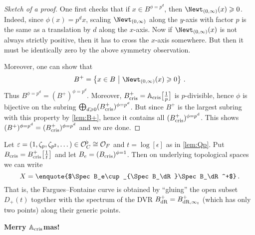 \documentclass[a4paper, 10pt, oneside, DIV=9, chapterprefix=true, numbers=enddot,bibliography=totoc]{scrbook}
\begin{document}
\begin{proof}[Sketch of a proof]
	One first checks that if $x\in B^{\phi=p^d}$, then $\Newt_{(0,\infty)}(x)\geq 0$. Indeed, since $\phi(x)=p^dx$, scaling $\Newt_{(0,\infty)}$ along the $y$-axis with factor $p$ is the same as a translation by $d$ along the $x$-axis. Now if $\Newt_{(0,\infty)}(x)$ is not always strictly positive, then it has to cross the $x$-axis somewhere. But then it must be identically zero by the above symmetry observation.
	
	Moreover, one can show that
	\begin{equation*}
		B^+=\left\{x\in B\st\Newt_{(0,\infty)}(x)\geq 0\right\}\,.
	\end{equation*}
	Thus $B^{\phi=p^d}=(B^+)^{\phi=p^d}$. Moreover, $B_{\mathrm{cris}}^+=\mathbb{A}_{\mathrm{cris}}\big[\textstyle\frac{1}{p}\big]$ is $p$-divisible, hence $\phi$ is bijective on the subring $\bigoplus_{d\geq 0}(B_\cris^+)^{\smash{\phi=p^d}}$. But since $B^+$ is the largest subring with this property by \cref{lem:B+}, hence it contains all $(B_\cris^+)^{\phi=p^d}$. This shows $(B^+)^{\phi=p^d}=(B_\cris^+)^{\phi=p^d}$ and we are done.
\end{proof}
\begin{rem}
	Let $\varepsilon=(1,\zeta_p,\zeta_{p^2},\dotsc)\in \mathcal{O}_C^\flat\cong \mathcal{O}_F$ and $t=\log{[\epsilon]}$ as in \cref{lem:Qp}. Put $B_{\mathrm{cris}}=B_{\mathrm{cris}}^+\big[\textstyle\frac{1}{t}\big]$ and let $B_e=(B_\cris)^{\phi=1}$. Then on underlying topological spaces we can write
	\begin{equation*}
		X=\text{\enquote{$\Spec B_e\cup_{\Spec B_\dR}\Spec B_\dR^+$}}\,.
	\end{equation*}
	That is, the Fargues--Fontaine curve is obtained by \enquote{gluing} the open subset $D_+(t)$ together with the spectrum of the DVR $B_{\mathrm{dR}}^+=B_{\mathrm{dR},\infty_t}^+$ (which has only two points) along their generic points.
\end{rem}
\begin{center}
	\Large\bfseries Merry $\mathbb{A}_{\mathrm{cris}}$mas!
\end{center}


\appendix

\backmatter{}
\printbibliography
\end{document}
